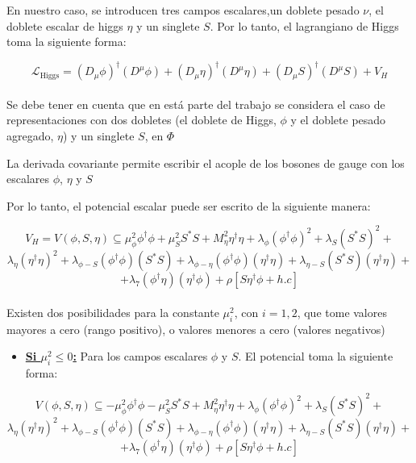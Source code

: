 \documentclass[12pt]{article}
\begin{document}
En nuestro caso, se introducen tres campos escalares,un doblete pesado $\nu$, el doblete escalar de higgs $\eta$ y un singlete $S$. Por lo tanto, el lagrangiano de  Higgs toma la siguiente forma: 

\begin{equation}
    \mathcal{L}_{\text{Higgs}}= (D_\mu\phi)^\dagger(D^\mu\phi)+ (D_\mu\eta)^\dagger(D^\mu\eta) + (D_\mu S)^\dagger(D^\mu S) + V_H
    \label{eq:HiggsDirac}
\end{equation}\\

 Se debe tener en cuenta que en está parte del trabajo se considera el caso de representaciones con dos dobletes (el doblete de Higgs, $\phi$  y el doblete pesado agregado, $\eta$) y un singlete  \(S\), en $\Phi$
 
La derivada covariante permite escribir el acople de los bosones de gauge
con los escalares \(\phi\), $\eta$ y $ S $



Por lo tanto, el potencial escalar puede ser escrito de la siguiente manera: 

    \begin{equation}
         V_H = V(\phi, S, \eta) \subseteq  \mu_\phi^2\phi^\dagger\phi +  \mu_S^2 S^* S+ M_\eta^2\eta^\dagger\eta + \lambda_\phi(\phi^\dagger\phi)^2+ \lambda_S(S^* S)^2 +     
    \end{equation}
\[ \lambda_\eta(\eta^\dagger\eta)^2 + 
     \lambda_{\phi-S}(\phi^\dagger\phi)(S^* S)+ \lambda_{\phi-\eta}(\phi^\dagger\phi)(\eta^\dagger\eta)+    \lambda_{\eta-S}(S^* S)(\eta^\dagger\eta)+  \]
    \[   + \lambda_7(\phi^\dagger\eta)(\eta^\dagger\phi) + \rho [S\eta^\dagger\phi+ h.c]  \] \\
    
    
Existen dos posibilidades para la constante \( \mu_i^2\), con $i=1,2$, que tome valores mayores a cero (rango positivo), o valores menores a cero (valores negativos)

\begin{itemize}
\item\underline{ \textbf{Si \( \mu_i^2\leq 0 \):}} Para los campos escalares $\phi$ y $S$. El potencial toma la siguiente forma:
\end{itemize}
 
 
    \begin{equation}
     \label{eq:PotencialDiracSee}
          V(\phi, S, \eta) \subseteq  -\mu_\phi^2\phi^\dagger\phi -  \mu_S^2 S^* S + M_\eta^2\eta^\dagger\eta + \lambda_\phi(\phi^\dagger\phi)^2+ \lambda_S(S^* S)^2 +   
    \end{equation}
\[ \lambda_\eta(\eta^\dagger\eta)^2 + 
     \lambda_{\phi-S}(\phi^\dagger\phi)(S^* S)+ \lambda_{\phi-\eta}(\phi^\dagger\phi)(\eta^\dagger\eta)+    \lambda_{\eta-S}(S^* S)(\eta^\dagger\eta)+  \]
    \[   + \lambda_7(\phi^\dagger\eta)(\eta^\dagger\phi) +  \rho [S\eta^\dagger\phi+ h.c]  \] \\
\end{document}
